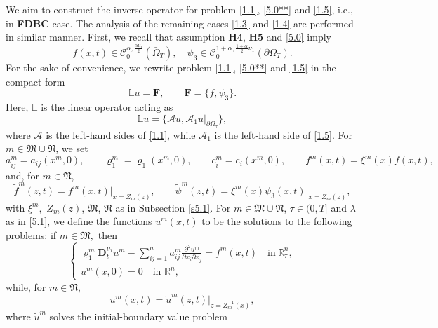 \documentclass[reqno]{amsart}
\def\C {\mathcal{C}}
\theoremstyle{definition}
\numberwithin{equation}{section}
\begin{document}
 We aim to construct the inverse operator for problem \eqref{1.1},  \eqref{5.0**} and \eqref{1.5}, i.e., in \textbf{FDBC} case. The analysis of the remaining cases \eqref{1.3} and \eqref{1.4} are performed in
 similar manner.
First, we recall that assumption \textbf{H4}, \textbf{H5} and \eqref{5.0} imply
\begin{equation}\label{5.2}
 f(x,t)\in \C_{0}^{\alpha,\frac{\alpha\nu_{1}}{2}}(\bar{\Omega}_{T}),\quad \psi_3\in\C_{0}^{1+\alpha,\frac{1+\alpha}{2}\nu_{1}}(\partial\Omega_{T}).
\end{equation}
For the sake of convenience, we rewrite problem \eqref{1.1},  \eqref{5.0**} and \eqref{1.5} in the compact form
\begin{equation}\label{5.3}
\mathbb{L}u=\mathbf{F},\qquad \mathbf{F}=\{f,\psi_3\}.
\end{equation}
Here, $\mathbb{L}$ is the linear operator acting as
\[
\mathbb{L}u=\{\mathcal{A}u,\mathcal{A}_1u|_{\partial\Omega_{\tau}}\},
\]
where $\mathcal{A}$ is  the left-hand sides of \eqref{1.1}, while $\mathcal{A}_1$
is the left-hand side of \eqref{1.5}.
For $m\in\mathfrak{M}\cup\mathfrak{N}$, we set
\begin{equation*}
a_{ij}^{m}=a_{ij}(x^{m},0),\qquad \varrho_{1}^{m}=\varrho_{1}(x^{m},0),\qquad c_{i}^{m}=c_{i}(x^{m},0),\qquad
f^{m}(x,t)=\xi^{m}(x)f(x,t),
\end{equation*}
and, for $m\in\mathfrak{N}$,
\begin{equation*}
\tilde{f}^{m}(z,t)=f^{m}(x,t)\big|_{x=Z_{m}(z)},\qquad
\tilde{\psi}^{m}(z,t)=\xi^{m}(x)\psi_3(x,t)\big|_{x=Z_{m}(z)},
\end{equation*}
with $\xi^{m},$ $Z_{m}(z)$, $\mathfrak{M}$, $\mathfrak{N}$  as in Subsection \ref{s5.1}.
For $m\in\mathfrak{M}\cup\mathfrak{N}$, $\tau\in(0,T]$ and $\lambda$ as in \eqref{5.1}, we define the functions $u^{m}(x,t)$ to be the solutions to the following problems: if $m\in\mathfrak{M},$ then
\begin{equation}\label{5.4}
\begin{cases}
\displaystyle \varrho_{1}^{m}\mathbf{D}_{t}^{\nu_{1}}u^{m}-\sum_{ij=1}^{n}a_{ij}^{m}\frac{\partial^{2}u^{m}}{\partial
x_{i}\partial x_{j}}=f^{m}(x,t)\quad \text{in}\
\mathbb{R}^{n}_{\tau},\\
u^{m}(x,0)=0\quad \text{in }
\mathbb{R}^{n},
\end{cases}
\end{equation}
while, for  $m\in\mathfrak{N}$,
$$u^{m}(x,t)=\tilde{u}^{m}(z,t)\big|_{z=Z_{m}^{-1}(x)},$$
where $\tilde{u}^{m}$ solves the initial-boundary value problem
\end{document}
